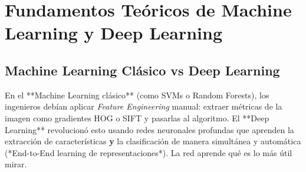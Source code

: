 \documentclass[11pt,a4paper]{article}
\begin{document}
\section{Fundamentos Te\'oricos de Machine Learning y Deep Learning}

\subsection{Machine Learning Cl\'asico vs Deep Learning}
En el **Machine Learning cl\'asico** (como SVMs o Random Forests), los ingenieros deb\'ian aplicar \emph{Feature Engineering} manual: extraer m\'etricas de la imagen como gradientes HOG o SIFT y pasarlas al algoritmo.
El **Deep Learning** revolucion\'o esto usando redes neuronales profundas que aprenden la extracci\'on de caracter\'isticas \textbf{y} la clasificaci\'on de manera simult\'anea y autom\'atica (*End-to-End learning de representaciones*). La red aprende qu\'e es lo m\'as \'util mirar.
\end{document}
